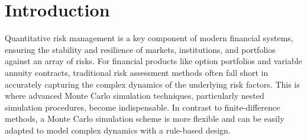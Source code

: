 \chapter{Introduction}

Quantitative risk management is a key component of modern financial systems, ensuring the stability and resilience of markets, institutions, and portfolios against an array of risks. 
For financial products like option portfolios and variable annuity contracts, traditional risk assessment methods often fall short in accurately capturing the complex dynamics of the underlying risk factors.
This is where advanced Monte Carlo simulation techniques, particularly nested simulation procedures, become indispensable.
In contrast to finite-difference methods, a Monte Carlo simulation scheme is more flexible and can be easily adapted to model complex dynamics with a rule-based design.






